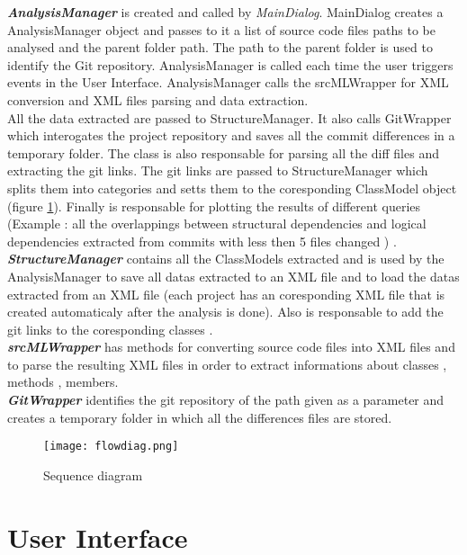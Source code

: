  \textit{\textbf{AnalysisManager}} is created and called by  \textit{MainDialog}. MainDialog creates a AnalysisManager object and passes to it a list of source code files paths to be analysed and the parent folder path. The path to the parent folder is used to identify the Git repository. AnalysisManager is called each time the user triggers events in the User Interface. AnalysisManager calls the srcMLWrapper for XML conversion and XML files parsing and data extraction.\\ All the data extracted are passed to StructureManager. It also calls GitWrapper which interogates the project repository and saves all the commit differences in a temporary folder. The class is also responsable for parsing all the diff files and extracting the git links. The git links are passed to StructureManager which splits them into categories and setts them to the coresponding ClassModel object (figure \ref{fig:seq}). Finally is responsable for plotting the results of different queries (Example : all the overlappings between structural dependencies and logical dependencies extracted from commits with less then 5 files changed ) .\\

 \textit{\textbf{StructureManager}} contains all the ClassModels extracted  and is used by the AnalysisManager to save all datas extracted to an XML file and to load the datas extracted from an XML file (each project has an coresponding XML file that is created automaticaly after the analysis is done). Also is responsable to add the git links to the coresponding classes .\\

\textit{\textbf{srcMLWrapper}} has methods for converting source code files into XML files and to parse the resulting XML files in order to extract informations about classes , methods , members.\\

\textit{\textbf{GitWrapper}} identifies the git repository of the path given as a parameter and creates a temporary folder in which all the differences files are stored.


\begin{figure}
\texttt{[image: flowdiag.png]}
\caption{Sequence diagram}
\label{fig:seq}
\end{figure}

\section{User Interface}

